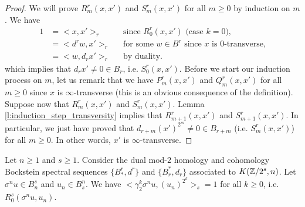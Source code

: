 \begin{proof}
We will prove $R^r_m(x,x')$ and $S^r_m(x,x')$ for all $m\geq0$ by induction on $m$. We have
\begin{align*}
1&=<x,x'>_r &&\text{since $R^r_0(x,x')$ (case $k=0$),}\\
&=<d^rw,x'>_r &&\text{for some $w\in B^r$ since $x$ is $0$-transverse,}\\
&=<w,d_r x'>_r &&\text{by duality.}
\end{align*}
which implies that $d_r x'\not=0\in B_r$, i.e. $S^r_0(x,x')$. Before we start our induction process on $m$, let us remark that we have $P^r_m(x,x')$ and $Q^r_m(x,x')$ for all $m\geq0$ since $x$ is $\infty$-transverse (this is an obvious consequence of the definition). Suppose now that $R^r_m(x,x')$ and $S^r_m(x,x')$. Lemma \ref{l:induction_step_transversity} implies that $R^r_{m+1}(x,x')$ and $S^r_{m+1}(x,x')$. In particular, we just have proved that $d_{r+m}(x')^{2^m}\not=0\in B_{r+m}$ (i.e. $S^r_m(x,x')$) for all $m\geq0$. In other words, $x'$ is $\infty$-transverse.
\end{proof}



\begin{lem}\label{l:implications of sigma to the n u and u_n}
Let $n\geq1$ and $s\geq1$. Consider the dual mod-$2$ homology and cohomology Bockstein spectral sequences $\{B_*^r,d^r\}$ and $\{B^*_r,d_r\}$ associated to $K(\mathbb{Z}/2^s,n)$. Let $\sigma^n u\in B_n^s$ and $u_n\in B^n_s$. We have $<\gamma_2^k \sigma^n u,(u_n)^{2^k}>_s=1$ for all $k\geq0$, i.e. $R^s_0(\sigma^n u,u_n)$.
\end{lem}

